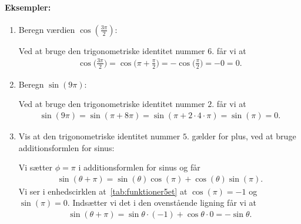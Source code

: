 \paragraph*{Eksempler:}
\begin{enumerate}
\item Beregn værdien $\cos(\frac{3\pi}{2})$:

Ved at bruge den trigonometriske identitet nummer $6.$ får vi at
\begin{align*}
\cos\Big( \frac{3\pi}{2}\Big) = \cos\Big(\pi + \frac{\pi}{2}\Big) = -\cos\Big(\frac{\pi}{2} \Big)=-0=0.
\end{align*}
\item Beregn $\sin(9\pi)$:

Ved at bruge den trigonometriske identitet nummer $2.$ får vi at
\begin{align*}
\sin(9\pi)=\sin(\pi + 8\pi)= \sin(\pi + 2 \cdot 4 \cdot \pi) = \sin(\pi) = 0.
\end{align*}
\item Vis at den trigonometriske identitet nummer $5$. gælder for plus, ved at bruge additionsformlen for sinus:

Vi sætter $\phi=\pi$ i additionsformlen for sinus og får
\begin{align*}
\sin(\theta+\pi) = \sin(\theta)\cos(\pi)+\cos(\theta)\sin(\pi).
\end{align*}
Vi ser i enhedscirklen at~\ref{tab:funktioner5et} at $\cos(\pi)=-1$ og $\sin(\pi)=0$. Indsætter vi det i den ovenstående ligning får vi at
\begin{align*}
\sin(\theta+\pi) = \sin\theta\cdot (-1)+\cos\theta\cdot 0 =-\sin\theta.
\end{align*}
\end{enumerate}